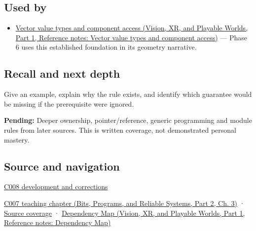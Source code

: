 \subsection{Used by}\label{appendix-3f7e15effba6-used-by}

\hypertarget{appendix-3f7e15effba6-used-by}{}

\begin{itemize}
\tightlist
\item
  \href{../07-Vision-XR-and-Playable-Worlds-P01/main.pdf\#appendix-37a39984ba66}{Vector value types and component access (Vision, XR, and Playable Worlds, Part 1, Reference notes: Vector value types and component access)} --- Phase 6 uses this established foundation in its geometry narrative.
\end{itemize}

\subsection{Recall and next depth}\label{appendix-3f7e15effba6-recall-and-next-depth}

\hypertarget{appendix-3f7e15effba6-recall-and-next-depth}{}

Give an example, explain why the rule exists, and identify which guarantee would be missing if the prerequisite were ignored.

\textbf{Pending:} Deeper ownership, pointer/reference, generic programming and module rules from later sources. This is written coverage, not demonstrated personal mastery.

\subsection{Source and navigation}\label{appendix-3f7e15effba6-source-and-navigation}

\hypertarget{appendix-3f7e15effba6-source-and-navigation}{}

\hyperref[appendix-fd090d982a15-m008---parts-113-126]{C008 development and corrections}

\href{../01-Bits-Programs-and-Reliable-Systems-P02/main.pdf\#01-foundations-i-ch003-bringing-the-object-model-back-to-bytes}{C007 teaching chapter (Bits, Programs, and Reliable Systems, Part 2, Ch. 3)} · \hyperref[appendix-fd090d982a15-m007---parts-101-112]{Source coverage} · \href{../07-Vision-XR-and-Playable-Worlds-P01/main.pdf\#appendix-4ad47bdd269a}{Dependency Map (Vision, XR, and Playable Worlds, Part 1, Reference notes: Dependency Map)}
